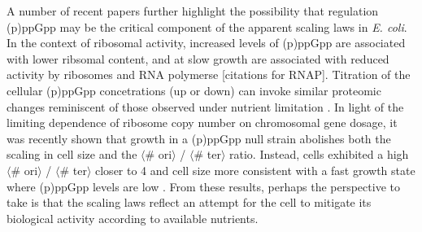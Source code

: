 A number of recent papers further highlight the possibility that regulation
(p)ppGpp may be the critical component of the apparent scaling laws in
\textit{E. coli}. In the context of ribosomal activity, increased levels of
(p)ppGpp are associated with lower ribsomal content, and at slow growth
are associated with reduced activity by ribosomes and RNA polymerse \citep{dai2016,
dai2018} [citations for RNAP]. Titration of the cellular (p)ppGpp concetrations (up or down) can
invoke similar proteomic changes reminiscent of those observed under nutrient
limitation \citep{zhu2019}. In light of the limiting dependence of ribosome copy
number on chromosomal gene dosage, it was recently shown that growth in a
(p)ppGpp null strain abolishes both the scaling in cell size  and the
$\langle$\# ori$\rangle$ / $\langle$\# ter$\rangle$ ratio. Instead, cells
exhibited a high $\langle$\# ori$\rangle$ / $\langle$\# ter$\rangle$ closer to 4
and cell size more consistent with a fast growth state where (p)ppGpp levels are
low \citep{fernandezcoll2020}. From these results, perhaps the perspective to
take is that the scaling laws  reflect an attempt for the cell to mitigate its
biological activity according  to available nutrients.
